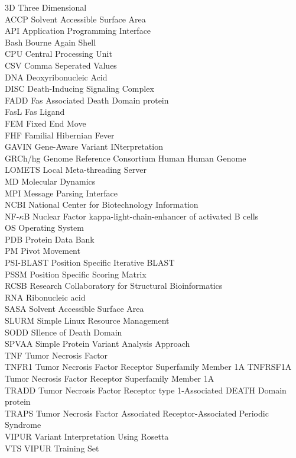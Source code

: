 3D Three Dimensional\\
ACCP Solvent Accessible Surface Area\\
API Application Programming Interface\\
Bash Bourne Again Shell\\
CPU Central Processing Unit\\
CSV Comma Seperated Values\\
DNA Deoxyribonucleic Acid\\
DISC Death-Inducing Signaling Complex\\
FADD Fas Associated Death Domain protein\\
FasL Fas Ligand\\
FEM Fixed End Move\\
FHF Familial Hibernian Fever\\
GAVIN Gene-Aware Variant INterpretation\\
GRCh/hg Genome Reference Consortium Human Human Genome\\
LOMETS Local Meta-threading Server\\
MD	Molecular Dynamics\\
MPI Message Parsing Interface\\
NCBI National Center for Biotechnology Information\\
NF-$\kappa$B Nuclear Factor kappa-light-chain-enhancer of activated B cells\\
OS Operating System\\
PDB Protein Data Bank\\
PM Pivot Movement\\
PSI-BLAST Position Specific Iterative BLAST\\
PSSM Position Specific Scoring Matrix\\
RCSB Research Collaboratory for Structural Bioinformatics\\
RNA Ribonucleic acid\\
SASA Solvent Accessible Surface Area\\
SLURM Simple Linux Resource Management\\
SODD SIlence of Death Domain\\
SPVAA Simple Protein Variant Analysis Approach\\
TNF Tumor Necrosis Factor\\
TNFR1 Tumor Necrosis Factor Receptor Superfamily Member 1A
TNFRSF1A Tumor Necrosis Factor Receptor Superfamily Member 1A\\
TRADD Tumor Necrosis Factor Receptor type 1-Associated DEATH Domain protein\\
TRAPS Tumor Necrosis Factor Associated Receptor-Associated Periodic Syndrome\\
VIPUR Variant Interpretation Using Rosetta\\
VTS VIPUR Training Set\\